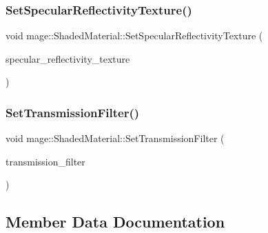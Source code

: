 \hypertarget{structmage_1_1_shaded_material_a8bd9bf0a0b1f636a74d3452c58b5b98d}{}\label{structmage_1_1_shaded_material_a8bd9bf0a0b1f636a74d3452c58b5b98d} 
\subsubsection{\texorpdfstring{Set\+Specular\+Reflectivity\+Texture()}{SetSpecularReflectivityTexture()}}
{\footnotesize\ttfamily void mage\+::\+Shaded\+Material\+::\+Set\+Specular\+Reflectivity\+Texture (\begin{DoxyParamCaption}\item[{\hyperlink{namespacemage_a1e01ae66713838a7a67d30e44c67703e}{Shared\+Ptr}$<$ \hyperlink{classmage_1_1_texture}{Texture} $>$}]{specular\+\_\+reflectivity\+\_\+texture }\end{DoxyParamCaption})}

\hypertarget{structmage_1_1_shaded_material_a8be0968eae5daf3d566ee063925671c6}{}\label{structmage_1_1_shaded_material_a8be0968eae5daf3d566ee063925671c6} 
\subsubsection{\texorpdfstring{Set\+Transmission\+Filter()}{SetTransmissionFilter()}}
{\footnotesize\ttfamily void mage\+::\+Shaded\+Material\+::\+Set\+Transmission\+Filter (\begin{DoxyParamCaption}\item[{const \hyperlink{structmage_1_1_r_g_b_spectrum}{R\+G\+B\+Spectrum} \&}]{transmission\+\_\+filter }\end{DoxyParamCaption})}



\subsection{Member Data Documentation}
\hypertarget{structmage_1_1_shaded_material_a744f6e4c0318f29f343039d6be072b66}{}\label{structmage_1_1_shaded_material_a744f6e4c0318f29f343039d6be072b66} 
